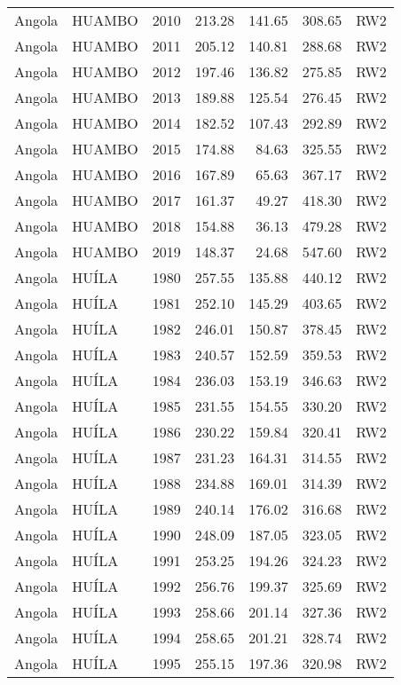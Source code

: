 \begin{longtable}{lllrrrl}
  Angola & HUAMBO & 2010 & 213.28 & 141.65 & 308.65 & RW2 \\ 
  Angola & HUAMBO & 2011 & 205.12 & 140.81 & 288.68 & RW2 \\ 
  Angola & HUAMBO & 2012 & 197.46 & 136.82 & 275.85 & RW2 \\ 
  Angola & HUAMBO & 2013 & 189.88 & 125.54 & 276.45 & RW2 \\ 
  Angola & HUAMBO & 2014 & 182.52 & 107.43 & 292.89 & RW2 \\ 
  Angola & HUAMBO & 2015 & 174.88 & 84.63 & 325.55 & RW2 \\ 
  Angola & HUAMBO & 2016 & 167.89 & 65.63 & 367.17 & RW2 \\ 
  Angola & HUAMBO & 2017 & 161.37 & 49.27 & 418.30 & RW2 \\ 
  Angola & HUAMBO & 2018 & 154.88 & 36.13 & 479.28 & RW2 \\ 
  Angola & HUAMBO & 2019 & 148.37 & 24.68 & 547.60 & RW2 \\ 
  Angola & HUÍLA & 1980 & 257.55 & 135.88 & 440.12 & RW2 \\ 
  Angola & HUÍLA & 1981 & 252.10 & 145.29 & 403.65 & RW2 \\ 
  Angola & HUÍLA & 1982 & 246.01 & 150.87 & 378.45 & RW2 \\ 
  Angola & HUÍLA & 1983 & 240.57 & 152.59 & 359.53 & RW2 \\ 
  Angola & HUÍLA & 1984 & 236.03 & 153.19 & 346.63 & RW2 \\ 
  Angola & HUÍLA & 1985 & 231.55 & 154.55 & 330.20 & RW2 \\ 
  Angola & HUÍLA & 1986 & 230.22 & 159.84 & 320.41 & RW2 \\ 
  Angola & HUÍLA & 1987 & 231.23 & 164.31 & 314.55 & RW2 \\ 
  Angola & HUÍLA & 1988 & 234.88 & 169.01 & 314.39 & RW2 \\ 
  Angola & HUÍLA & 1989 & 240.14 & 176.02 & 316.68 & RW2 \\ 
  Angola & HUÍLA & 1990 & 248.09 & 187.05 & 323.05 & RW2 \\ 
  Angola & HUÍLA & 1991 & 253.25 & 194.26 & 324.23 & RW2 \\ 
  Angola & HUÍLA & 1992 & 256.76 & 199.37 & 325.69 & RW2 \\ 
  Angola & HUÍLA & 1993 & 258.66 & 201.14 & 327.36 & RW2 \\ 
  Angola & HUÍLA & 1994 & 258.65 & 201.21 & 328.74 & RW2 \\ 
  Angola & HUÍLA & 1995 & 255.15 & 197.36 & 320.98 & RW2 \\ 

\end{longtable}
